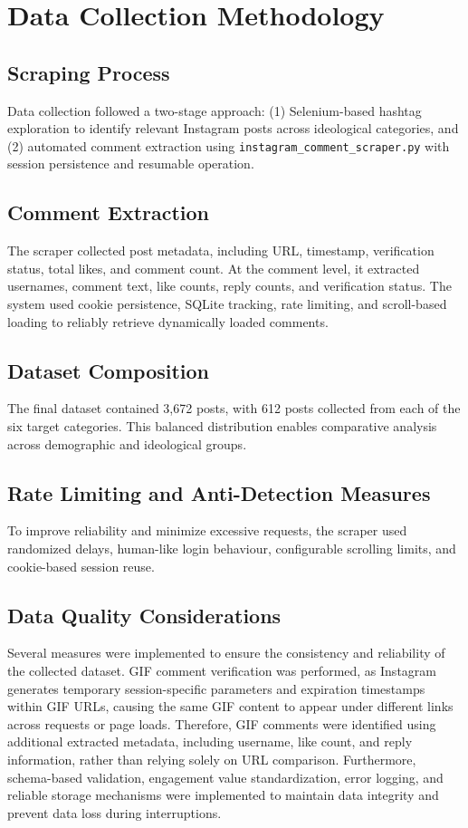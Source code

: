 \section{Data Collection Methodology}

\subsection{Scraping Process}

Data collection followed a two-stage approach: (1) Selenium-based hashtag exploration to identify relevant Instagram posts across ideological categories, and (2) automated comment extraction using \texttt{instagram\_comment\_scraper.py} with session persistence and resumable operation.

\subsection{Comment Extraction}

The scraper collected post metadata, including URL, timestamp, verification status, total likes, and comment count. At the comment level, it extracted usernames, comment text, like counts, reply counts, and verification status. The system used cookie persistence, SQLite tracking, rate limiting, and scroll-based loading to reliably retrieve dynamically loaded comments.

\subsection{Dataset Composition}

The final dataset contained 3,672 posts, with 612 posts collected from each of the six target categories. This balanced distribution enables comparative analysis across demographic and ideological groups.

\subsection{Rate Limiting and Anti-Detection Measures}

To improve reliability and minimize excessive requests, the scraper used randomized delays, human-like login behaviour, configurable scrolling limits, and cookie-based session reuse.

\subsection{Data Quality Considerations}
Several measures were implemented to ensure the consistency and reliability of the collected dataset. GIF comment verification was performed, as Instagram generates temporary session-specific parameters and expiration timestamps within GIF URLs, causing the same GIF content to appear under different links across requests or page loads. Therefore, GIF comments were identified using additional extracted metadata, including username, like count, and reply information, rather than relying solely on URL comparison. Furthermore, schema-based validation, engagement value standardization, error logging, and reliable storage mechanisms were implemented to maintain data integrity and prevent data loss during interruptions.


